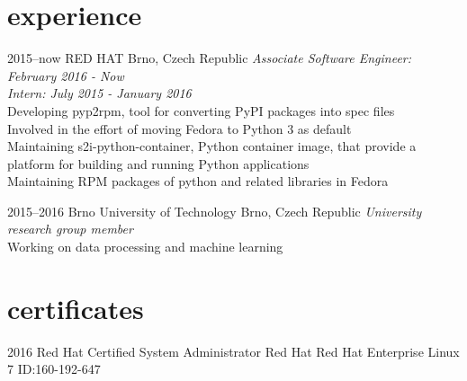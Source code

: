 \documentclass[]{friggeri-cv} %
\begin{document}

\section{experience}


\begin{entrylist}


\entry
{2015--now}
{RED HAT}
{Brno, Czech Republic}
{\emph{Associate Software Engineer: February 2016 - Now} \\
\emph{Intern: July 2015 - January 2016} \\
Developing pyp2rpm, tool for converting PyPI packages into spec files
\\Involved in the effort of moving Fedora to Python 3 as default
\\Maintaining s2i-python-container, Python container image, that provide a platform for building and running Python applications
\\Maintaining RPM packages of python and related libraries
    in Fedora}


\entry
{2015--2016}
{Brno University of Technology}
{Brno, Czech Republic}
{\emph{University research group member} \\ Working on data processing and machine learning}

\end{entrylist}



\section{certificates}

\begin{entrylist}


\entry
{2016}
{Red Hat Certified System Administrator}
{Red Hat}
{Red Hat Enterprise Linux 7 ID:160-192-647}


\end{entrylist}
\end{document}
